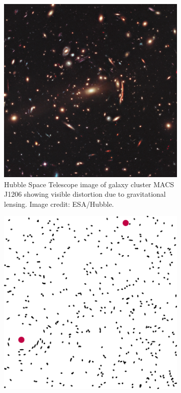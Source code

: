 \begin{figure}[!t]
\centering
\begin{subfigure}[b]{.46\linewidth}
\vskip 0pt
\centering
\includegraphics[width=\textwidth]{images/gravitation-lensing-macs-j1206-nasa-square-crop}
\vskip 0pt
\caption{Hubble Space Telescope image of galaxy cluster MACS J1206 showing visible distortion due to gravitational lensing. Image credit: ESA/Hubble.}
\label{sfig:gravitational-lensing-photo}
\end{subfigure}%
\hspace*{\fill}
\begin{subfigure}[b]{.46\linewidth}
\vskip 0pt
\centering
\includegraphics[width=\textwidth]{images/simulated-galaxy-cluster}

\end{subfigure}
\end{figure}
